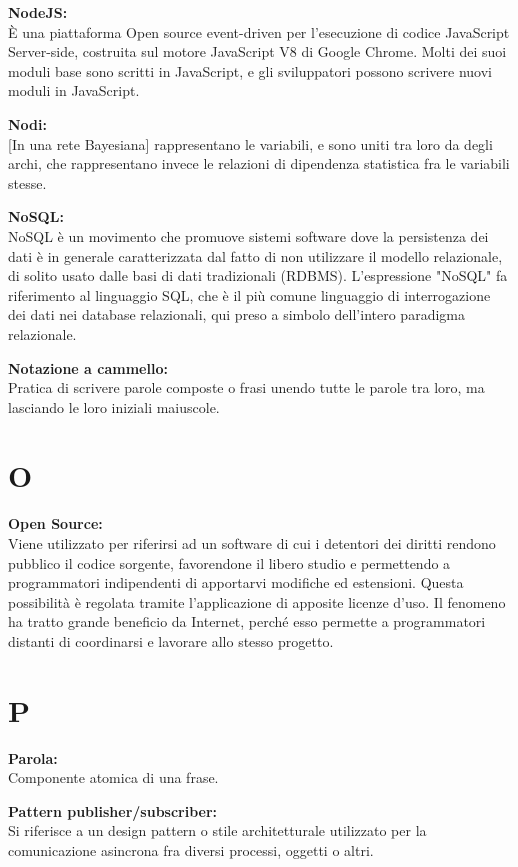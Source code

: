 \documentclass[a4paper, oneside, openany, dvipsnames, table]{article}
\begin{document}
\textbf{NodeJS:}\\	\`E una piattaforma Open source event-driven per l'esecuzione di codice JavaScript Server-side, costruita sul motore JavaScript V8 di Google Chrome. Molti dei suoi moduli base sono scritti in JavaScript, e gli sviluppatori possono scrivere nuovi moduli in JavaScript.

\textbf{Nodi:}\\ 
{[}In una rete Bayesiana{]} rappresentano le variabili, e sono uniti tra loro da degli archi, che rappresentano invece le relazioni di dipendenza statistica fra le variabili stesse.

\textbf{NoSQL:}\\
NoSQL è un movimento che promuove sistemi software dove la persistenza dei dati è in generale caratterizzata dal fatto di non utilizzare il modello relazionale, di solito usato dalle basi di dati tradizionali (RDBMS). L'espressione "NoSQL" fa riferimento al linguaggio SQL, che è il più comune linguaggio di interrogazione dei dati nei database relazionali, qui preso a simbolo dell'intero paradigma relazionale.

\textbf{Notazione a cammello:}\\	Pratica di scrivere parole composte o frasi unendo tutte le parole tra loro, ma lasciando le loro iniziali maiuscole.

\newpage
\section{O}
\textbf{Open Source:}\\	Viene utilizzato per riferirsi ad un software di cui i detentori dei diritti rendono pubblico il codice sorgente, favorendone il libero studio e permettendo a programmatori indipendenti di apportarvi modifiche ed estensioni. Questa possibilità è regolata tramite l'applicazione di apposite licenze d'uso. Il fenomeno ha tratto grande beneficio da Internet, perché esso permette a programmatori distanti di coordinarsi e lavorare allo stesso progetto.

\newpage
\section{P}
\label{par:parola}
\textbf{Parola:}\\	Componente atomica di una frase.

\textbf{Pattern publisher/subscriber:}\\	 Si riferisce a un design pattern o stile architetturale utilizzato per la comunicazione asincrona fra diversi processi, oggetti o altri.
\end{document}
